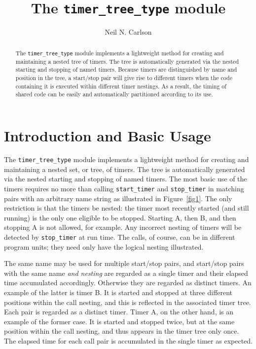 \documentclass[11pt]{article}
\begin{document}
\title{The \texttt{timer_tree_type} module}
\author{Neil N. Carlson}
\date{} %
\maketitle

\begin{abstract}
The \texttt{timer_tree_type} module implements a lightweight method for
creating and maintaining a nested tree of timers.  The tree is automatically
generated via the nested starting and stopping of named timers.  Because
timers are distinguished by name and position in the tree, a start/stop
pair will give rise to different timers when the code containing it is
executed within different timer nestings.  As a result, the timing of
shared code can be easily and automatically partitioned according to its use.
\end{abstract}

\section{Introduction and Basic Usage}
The \texttt{timer_tree_type} module implements a lightweight method for
creating and maintaining a nested set, or tree, of timers.  The tree is
automatically generated via the nested starting and stopping of named
timers.  The most basic use of the timers requires no more than calling
\texttt{start_timer} and \texttt{stop_timer} in matching pairs with an
arbitrary name string as illustrated in Figure~\ref{fig1}.  The only
restriction is that the timers be nested: the timer most recently started
(and still running) is the only one eligible to be stopped.  Starting A,
then B, and then stopping A is not allowed, for example.  Any incorrect
nesting of timers will be detected by \texttt{stop_timer} at run time.
The calls, of course, can be in different program units; they need only
have the logical nesting illustrated.

The same name may be used for multiple start/stop pairs, and start/stop
pairs with the same name \emph{and nesting} are regarded as a single timer
and their elapsed time accumulated accordingly. Otherwise they are regarded
as distinct timers.  An example of the latter is timer B. It is started and
stopped at three different positions within the call nesting, and this is
reflected in the associated timer tree.  Each pair is regarded as a distinct
timer.  Timer A, on the other hand, is an example of the former case.
It is started and stopped twice, but at the same position within the call
nesting, and thus appears in the timer tree only once.  The elapsed time for
each call pair is accumulated in the single timer as expected.
\end{document}
